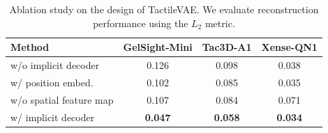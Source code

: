 \begin{table}[t]
\centering
\caption{Ablation study on the design of TactileVAE. We evaluate reconstruction performance using the $L_2$ metric.}
\label{tab:vae_ablation}
\small
\renewcommand{\arraystretch}{1.2} %
\setlength{\tabcolsep}{2pt} 

\begin{tabular}{l S[table-format=1.3] S[table-format=1.3] S[table-format=1.3]}
\toprule
\textbf{Method} & {\textbf{GelSight-Mini}} & {\textbf{Tac3D-A1}} & {\textbf{Xense-QN1}} \\
\midrule
w/o implicit decoder & 0.126 & 0.098 & 0.038 \\
w/ position embed. & 0.102 & 0.085 & 0.035 \\
w/o spatial feature map & 0.107 & 0.084 & 0.071 \\
w/ implicit decoder & \textbf{0.047} & \textbf{0.058} & \textbf{0.034} \\
\bottomrule
\end{tabular}
\end{table}